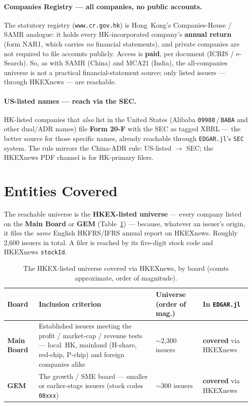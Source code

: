 \documentclass[11pt,a4paper]{report}
\begin{document}
\paragraph{Companies Registry --- all companies, no public accounts.} The statutory registry
(\texttt{www.cr.gov.hk}) is Hong~Kong's Companies-House / SAMR analogue: it holds every HK-incorporated
company's \textbf{annual return} (form NAR1, which carries \emph{no} financial statements), and private
companies are not required to file accounts publicly. Access is \textbf{paid}, per document (ICRIS / e-Search).
So, as with SAMR (China) and MCA21 (India), the all-companies universe is not a practical financial-statement
source; only listed issuers --- through HKEXnews --- are reachable.

\paragraph{US-listed names --- reach via the SEC.} HK-listed companies that \emph{also} list in the United
States (Alibaba \texttt{09988}\,/\,\texttt{BABA} and other dual/ADR names) file \textbf{Form 20-F} with the SEC
as tagged XBRL --- the better source for those specific names, already reachable through \texttt{EDGAR.jl}'s
\texttt{SEC} system. The rule mirrors the China-ADR rule: US-listed $\to$ SEC; the HKEXnews PDF channel is for
HK-primary filers.

\section{Entities Covered}\label{sec:hk-entities}

The reachable universe is the \textbf{HKEX-listed universe} --- every company listed on the \textbf{Main
Board} or \textbf{GEM} (Table~\ref{tab:hk-entities}) --- because, whatever an issuer's origin, it files the
\emph{same} English HKFRS/IFRS annual report on HKEXnews. Roughly 2{,}600 issuers in total. A filer is reached
by its five-digit stock code and HKEXnews \texttt{stockId}.

\begin{table}[h]
\centering
\small
\caption{The HKEX-listed universe covered via HKEXnews, by board (counts approximate, order of magnitude).}
\label{tab:hk-entities}
\begin{tabular}{@{}p{}p{}p{}p{}@{}}
\toprule
\textbf{Board} & \textbf{Inclusion criterion} & \textbf{Universe (order of mag.)} & \textbf{In
\texttt{EDGAR.jl}} \\
\midrule
\textbf{Main Board} & Established issuers meeting the profit / market-cap / revenue tests --- local~HK,
  mainland (H-share, red-chip, P-chip) and foreign companies alike & $\sim$2{,}300 issuers & \textbf{covered}
  via HKEXnews \\
\textbf{GEM} & The growth / SME board --- smaller or earlier-stage issuers (stock codes \texttt{08xxx}) &
  $\sim$300 issuers & \textbf{covered} via HKEXnews \\
\bottomrule
\end{tabular}
\end{table}
\end{document}
